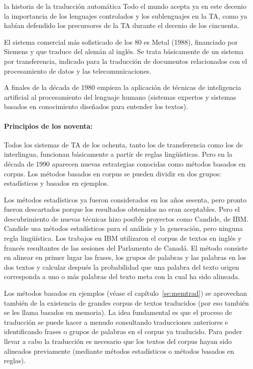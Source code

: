 \begin{persabermes}{la historia de la traducción automática}
Todo el mundo acepta ya en este decenio la importancia de los lenguajes controlados y los sublenguajes en la TA, como ya habían defendido los precursores de la TA durante el decenio de los cincuenta. 

El sistema comercial más sofisticado de los 80 es Metal (1988), financiado por Siemens y que traduce del alemán al inglés. Se trata básicamente de un sistema por transferencia, indicado para la traducción de documentos relacionados con el procesamiento de datos y las telecomunicaciones. 

A finales de la década de 1980 empieza la aplicación de técnicas de inteligencia artificial al procesamiento del lenguaje humano (sistemas expertos y sistemas basados en conocimiento diseñados para entender los textos). 

\paragraph{Principios de los noventa:} Todos los sistemas de TA de los ochenta, tanto los de transferencia como los de interlingua, funcionan básicamente a partir de reglas lingüísticas. Pero en la década de 1990 aparecen nuevas estrategias conocidas como métodos basados en corpus. Los métodos basados en corpus se pueden dividir en dos grupos: estadísticos y basados en ejemplos. 

Los métodos estadísticos ya fueron considerados en los años sesenta, pero pronto fueron descartados porque los resultados obtenidos no eran aceptables. Pero el descubrimiento de nuevas técnicas hizo posible proyectos como Candide, de IBM. Candide usa métodos estadísticos para el análisis y la generación, pero ninguna regla lingüística. Los trabajos en IBM utilizaron el corpus de textos en inglés y francés resultantes de las sesiones del Parlamento de Canadá. El método consiste en alinear en primer lugar las frases, los grupos de palabras y las palabras en los dos textos y calcular después la probabilidad que una palabra del texto origen corresponda a uno o más palabras del texto meta con la cual ha sido alineada. 

Los métodos basados en ejemplos (véase el capítulo~\ref{se:memtrad}) se aprovechan también de la existencia de grandes corpus de textos traducidos (por eso también se les llama basados en memoria). La idea fundamental es que el proceso de traducción se puede hacer a menudo consultando traducciones anteriores e identificando frases o grupos de palabras en el corpus ya traducido. Para poder llevar a cabo la traducción es necesario que los textos del corpus hayan sido alineados previamente (mediante métodos estadísticos o métodos basados en reglas). 


\end{persabermes}
